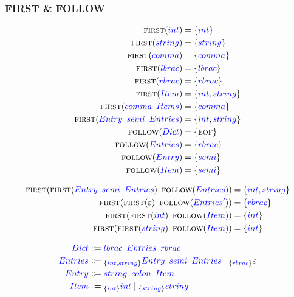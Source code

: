 \documentclass{article}
\newcommand{\FIRST}{\textsc{first}}
\newcommand{\FOLLOW}{\textsc{follow}}
\newcommand{\EOF}{\textsc{eof}}
\newcommand{\Symbol}[1]{\textcolor{blue}{#1}}
\newcommand{\Null}{\varepsilon}
\newcommand{\Arrow}{\Coloneq}
\newcommand{\Seq}{{\ \,}}
\newcommand{\Union}{\mathrel{|}}
\newcommand{\Lookahead}[1]{{}_{\{{#1}\}}}
\begin{document}
\subsubsection*{FIRST \& FOLLOW}
\begin{equation*}
  \begin{aligned}
    \FIRST(\Symbol{int}) &= \{\Symbol{int}\}\\
    \FIRST(\Symbol{string}) &= \{\Symbol{string}\}\\
    \FIRST(\Symbol{comma}) &= \{\Symbol{comma}\}\\
    \FIRST(\Symbol{lbrac}) &= \{\Symbol{lbrac}\}\\
    \FIRST(\Symbol{rbrac}) &= \{\Symbol{rbrac}\}\\
    \FIRST(\Symbol{Item}) &= \{\Symbol{int}, \Symbol{string}\}\\
    \FIRST(\Symbol{comma} \Seq \Symbol{Items}) &= \{\Symbol{comma}\}\\
    \FIRST(\Symbol{Entry} \Seq \Symbol{semi} \Seq \Symbol{Entries}) &= \{\Symbol{int}, \Symbol{string}\}\\
    \FOLLOW(\Symbol{Dict}) &= \{\EOF\}\\
    \FOLLOW(\Symbol{Entries}) &= \{\Symbol{rbrac}\}\\
    \FOLLOW(\Symbol{Entry}) &= \{\Symbol{semi}\}\\
    \FOLLOW(\Symbol{Item}) &= \{\Symbol{semi}\}
  \end{aligned}
\end{equation*}

\begin{equation*}
  \begin{aligned}
    \FIRST(\FIRST(\Symbol{Entry} \Seq \Symbol{semi} \Seq \Symbol{Entries}) \Seq \FOLLOW(\Symbol{Entries})) &= \{\Symbol{int}, \Symbol{string}\}\\
    \FIRST(\FIRST(\Null) \Seq \FOLLOW(\Symbol{Entries'})) &= \{\Symbol{rbrac}\}\\
    \FIRST(\FIRST(\Symbol{int}) \Seq \FOLLOW(\Symbol{Item})) &= \{\Symbol{int}\}\\
    \FIRST(\FIRST(\Symbol{string}) \Seq \FOLLOW(\Symbol{Item})) &= \{\Symbol{int}\}\\
  \end{aligned}
\end{equation*}

\begin{equation*}
  \begin{aligned}
    \Symbol{Dict} &\Arrow \Symbol{lbrac} \Seq \Symbol{Entries} \Seq \Symbol{rbrac}\\
    \Symbol{Entries} &\Arrow \Lookahead{\Symbol{int}, \Symbol{string}} \Symbol{Entry} \Seq \Symbol{semi} \Seq \Symbol{Entries} \Union \Lookahead{\Symbol{rbrac}} \Null\\
    \Symbol{Entry} &\Arrow \Symbol{string} \Seq \Symbol{colon} \Seq \Symbol{Item}\\
    \Symbol{Item} &\Arrow \Lookahead{\Symbol{int}} \Symbol{int} \Union \Lookahead{\Symbol{string}} \Symbol{string}
  \end{aligned}
\end{equation*}
\end{document}
